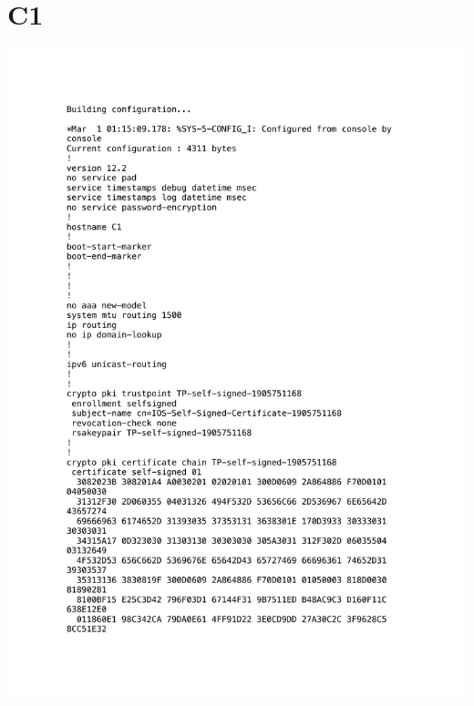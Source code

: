 \documentclass[11pt,a4paper]{scrreprt}
\begin{document}
\section{C1}
\vspace{-1cm}
\includegraphics[height=\dimexpr\textheight-4\baselineskip\relax,page=1]{../config_files/C1.pdf}

\end{document}
